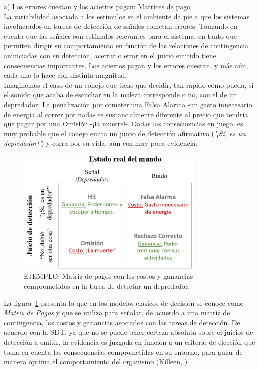       \underline{a) Los errores cuestan y los aciertos pagan: Matrices de pago}\\

La variabilidad asociada a los estímulos en el ambiente da pie a que los sistemas involucrados en tareas de detección de señales cometan errores. Tomando en cuenta que las señales son estímulos relevantes para el sistema, en tanto que permiten dirigir su comportamiento en función de las relaciones de contingencia anunciadas con su detección, acertar o errar en el juicio emitido tiene consecuencias importantes. Los aciertos pagan y los errores cuestan, y más aún, cada uno lo hace con distinta magnitud.\\

Imaginemos el caso de un conejo que tiene que decidir, tan rápido como pueda, si el sonido que acaba de escuchar en la maleza corresponde o no, con el de un depredador. La penalización por cometer una Falsa Alarma -un gasto innecesario de energía al correr por nada- es sustancialmente diferente al precio que tendría que pagar por una Omisión -¡la muerte!-. Dadas las consecuencias en juego, es muy probable que el conejo emita un juicio de detección afirmativo (\textit{'¡Sí, es un depredador!'}) y corra por su vida, aún con muy poca evidencia.\\

\begin{figure}[th]
\centering
\includegraphics[width=0.80\textwidth]{Figures/Matriz_Pagos} 
\caption[Matriz de Pagos: Consecuencias comprometidas en una tarea de detección hipotética (ejemplo)]{EJEMPLO: Matriz de pagos con los costos y ganancias comprometidos en la tarea de detectar un depredador.}
\label{fig:Mat_Pagos}
\end{figure}

La figura~\ref{fig:Mat_Pagos} presenta lo que en los modelos clásicos de decisión se conoce como \textit{Matriz de Pagos} y que se utiliza para señalar, de acuerdo a una matriz de contingencia, los costos y ganancias asociados con las tareas de detección. De acuerdo con la SDT, ya que no se puede tener certeza absoluta sobre el juicios de detección a emitir, la evidencia es juzgada en función a un criterio de elección que toma en cuenta las consecuencias comprometidas en su entorno, para guiar de manera óptima el comportamiento del organismo (Killeen, \citeyear{Killeen2014}).\\

